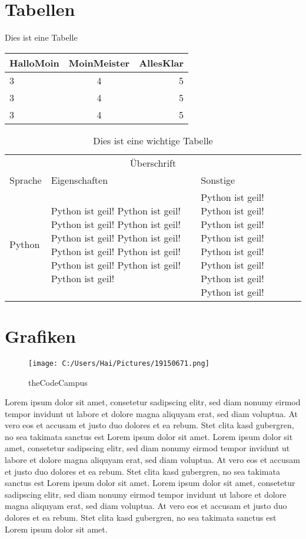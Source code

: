 \documentclass[a4paper, 12pt]{report}
\begin{document}
	\chapter{Tabellen}
	
	Dies ist eine \hypertarget{tabelle1}{Tabelle}
	\begin{table}[h]	
		\begin{tabular}{| l | c | r |} %
			\hline
			HalloMoin & MoinMeister & AllesKlar \\
			\hline
			3 & 4 & 5 \\ \rowcolor{yellow}
			3 & 4 & 5 \\ \cline{2-3}
			3 & 4 & 5 \\
			\hline
		\end{tabular}
	\end{table}
	

	\begin{table}[h]
		\setlength{\tabcolsep}{10pt} %
		\begin{tabular}{l | p{5cm} | p{3cm}} %
			\multicolumn{3}{c}{Überschrift} \\
			Sprache & Eigenschaften & Sonstige \\
			\hline \hline
			Python & Python ist geil! Python ist geil! Python ist geil! Python ist geil! Python ist geil! Python ist geil! Python ist geil! Python ist geil! Python ist geil! Python ist geil! Python ist geil! & Python ist geil! Python ist geil! Python ist geil! Python ist geil! Python ist geil! Python ist geil! Python ist geil! Python ist geil! \\
		\end{tabular}
	\caption{Dies ist eine wichtige Tabelle}
	\label{meinetabelle}
	\end{table}

	\chapter{Grafiken}
	\begin{figure}[b] %
		\centering
		\texttt{[image: C:/Users/Hai/Pictures/19150671.png]}
		\caption{theCodeCampus}
	\end{figure}

	Lorem ipsum dolor sit amet, consetetur sadipscing elitr, sed diam nonumy eirmod tempor invidunt ut labore et dolore magna aliquyam erat, sed diam voluptua. At vero eos et accusam et justo duo dolores et ea rebum. Stet clita kasd gubergren, no sea takimata sanctus est Lorem ipsum dolor sit amet. Lorem ipsum dolor sit amet, consetetur sadipscing elitr, sed diam nonumy eirmod tempor invidunt ut labore et dolore magna aliquyam erat, sed diam voluptua. At vero eos et accusam et justo duo dolores et ea rebum. Stet clita kasd gubergren, no sea takimata sanctus est Lorem ipsum dolor sit amet. Lorem ipsum dolor sit amet, consetetur sadipscing elitr, sed diam nonumy eirmod tempor invidunt ut labore et dolore magna aliquyam erat, sed diam voluptua. At vero eos et accusam et justo duo dolores et ea rebum. Stet clita kasd gubergren, no sea takimata sanctus est Lorem ipsum dolor sit amet.	
	
\end{document}
